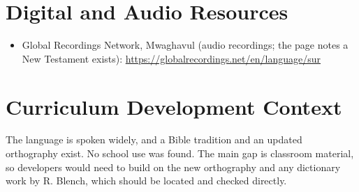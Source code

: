 \documentclass[12pt]{article}
\begin{document}
\section{Digital and Audio Resources}
\begin{itemize}
\item Global Recordings Network, Mwaghavul (audio recordings; the page notes a New Testament exists): \url{https://globalrecordings.net/en/language/sur}
\end{itemize}

\section{Curriculum Development Context}
The language is spoken widely, and a Bible tradition and an updated orthography exist. No school use was found. The main gap is classroom material, so developers would need to build on the new orthography and any dictionary work by R. Blench, which should be located and checked directly.
\end{document}
